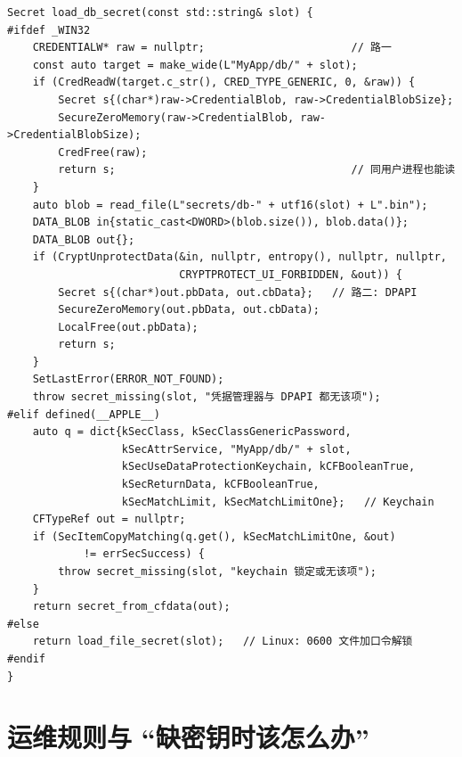 \documentclass[12pt,a4paper,fontset=fandol]{ctexbook}
\begin{document}
\begin{lstlisting}[caption={C++：Windows 凭据管理器与 DPAPI、退回文件的读取骨架}]
Secret load_db_secret(const std::string& slot) {
#ifdef _WIN32
    CREDENTIALW* raw = nullptr;                       // 路一
    const auto target = make_wide(L"MyApp/db/" + slot);
    if (CredReadW(target.c_str(), CRED_TYPE_GENERIC, 0, &raw)) {
        Secret s{(char*)raw->CredentialBlob, raw->CredentialBlobSize};
        SecureZeroMemory(raw->CredentialBlob, raw->CredentialBlobSize);
        CredFree(raw);
        return s;                                     // 同用户进程也能读
    }
    auto blob = read_file(L"secrets/db-" + utf16(slot) + L".bin");
    DATA_BLOB in{static_cast<DWORD>(blob.size()), blob.data()};
    DATA_BLOB out{};
    if (CryptUnprotectData(&in, nullptr, entropy(), nullptr, nullptr,
                           CRYPTPROTECT_UI_FORBIDDEN, &out)) {
        Secret s{(char*)out.pbData, out.cbData};   // 路二: DPAPI
        SecureZeroMemory(out.pbData, out.cbData);
        LocalFree(out.pbData);
        return s;
    }
    SetLastError(ERROR_NOT_FOUND);
    throw secret_missing(slot, "凭据管理器与 DPAPI 都无该项");
#elif defined(__APPLE__)
    auto q = dict{kSecClass, kSecClassGenericPassword,
                  kSecAttrService, "MyApp/db/" + slot,
                  kSecUseDataProtectionKeychain, kCFBooleanTrue,
                  kSecReturnData, kCFBooleanTrue,
                  kSecMatchLimit, kSecMatchLimitOne};   // Keychain
    CFTypeRef out = nullptr;
    if (SecItemCopyMatching(q.get(), kSecMatchLimitOne, &out)
            != errSecSuccess) {
        throw secret_missing(slot, "keychain 锁定或无该项");
    }
    return secret_from_cfdata(out);
#else
    return load_file_secret(slot);   // Linux: 0600 文件加口令解锁
#endif
}
\end{lstlisting}

\section{运维规则与 ``缺密钥时该怎么办''}
\end{document}
